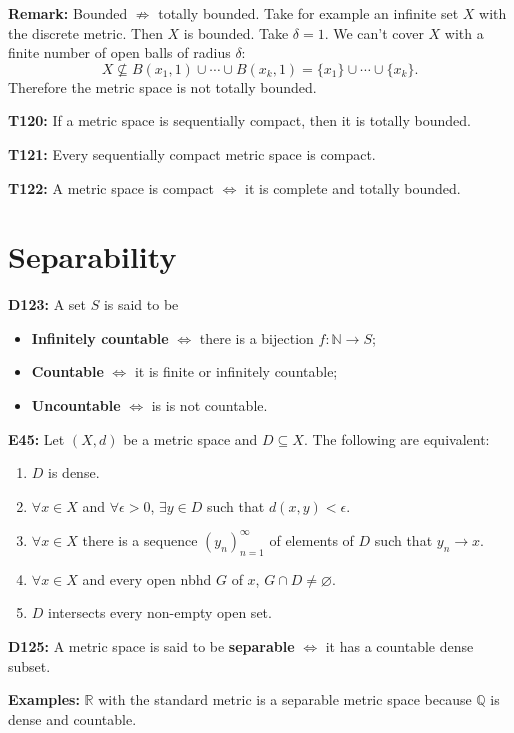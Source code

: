 \documentclass[twocolumn,10pt]{article}
\begin{document}
\textbf{Remark:} Bounded $\not\Rightarrow$ totally bounded. Take for example an infinite set $X$ with the discrete metric. Then $X$ is bounded. Take $\delta=1$. We can't cover $X$ with a finite number of open balls of radius $\delta$:
\begin{equation*}
    X \not\subseteq B(x_1,1) \cup \cdots \cup B(x_k,1) = \{x_1\} \cup \cdots \cup \{x_k\}.
\end{equation*}
Therefore the metric space is not totally bounded.

\textbf{T120:} If a metric space is sequentially compact, then it is totally bounded.

\textbf{T121:} Every sequentially compact metric space is compact.

\textbf{T122:} A metric space is compact $\Leftrightarrow$ it is complete and totally bounded.


\section{Separability}

\textbf{D123:} A set $S$ is said to be
\begin{itemize}
    \item \textbf{Infinitely countable} $\Leftrightarrow$ there is a bijection $f:\mathbb{N}\to S$;
    \item \textbf{Countable} $\Leftrightarrow$ it is finite or infinitely countable;
    \item \textbf{Uncountable} $\Leftrightarrow$ is is not countable.
\end{itemize}
\textbf{E45:} Let $(X,d)$ be a metric space and $D\subseteq X$. The following are equivalent:
\begin{enumerate}
    \item $D$ is dense.
    \item $\forall x\in X$ and $\forall\epsilon>0$, $\exists y\in D$ such that $d(x,y)<\epsilon$.
    \item $\forall x\in X$ there is a sequence $(y_n)_{n=1}^{\infty}$ of elements of $D$ such that $y_n\to x$.
    \item $\forall x\in X$ and every open nbhd $G$ of $x$, $G\cap D\neq\varnothing$.
    \item $D$ intersects every non-empty open set.
\end{enumerate}
\textbf{D125:} A metric space is said to be \textbf{separable} $\Leftrightarrow$ it has a countable dense subset.

\color{red}
\textbf{Examples:} $\mathbb{R}$ with the standard metric is a separable metric space because $\mathbb{Q}$ is dense and countable.
\end{document}
